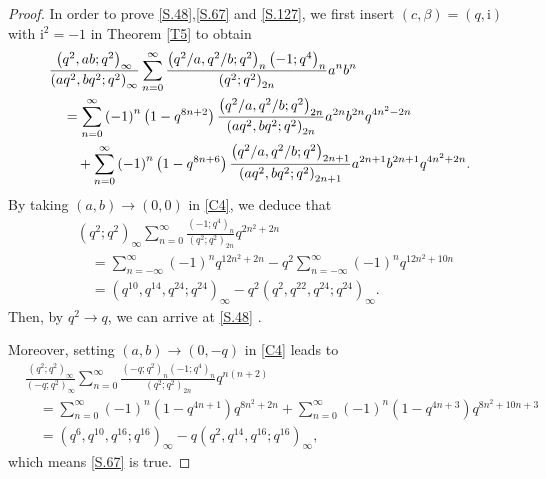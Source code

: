 \documentclass[reqno,12pt]{amsart}
\theoremstyle{remark}
\numberwithin{equation}{section}
\begin{document}
\begin{proof}
In order to prove \eqref{S.48},\eqref{S.67} and \eqref{S.127}, we first
insert $\left(c,\beta\right)=\left(q,\mathrm{i}\right)$ with $\mathrm{i}^2=-1$ in Theorem \ref{T5} to obtain
\begin{align}
&\frac{\left(q^2,ab;q^2\right)_{\infty}}{\left(aq^2,bq^2;q^2\right)_{\infty}}
\sum_{n=0}^{\infty}
\frac{\left(q^2/a,q^2/b;q^2\right)_n\left(-1;q^4\right)_n}{\left(q^2;q^2\right)_{2n}}a^nb^n\notag\\
&\quad=
\sum_{n=0}^{\infty}\left(-1\right)^n\left(1-q^{8n+2}\right)\frac{\left(q^2/a,q^2/b;q^2\right)_{2n}}
{\left(aq^2,bq^2;q^2\right)_{2n}}a^{2n}b^{2n}q^{4n^2-2n}\notag\\
&\qquad+
\sum_{n=0}^{\infty}\left(-1\right)^n\left(1-q^{8n+6}\right)\frac{\left(q^2/a,q^2/b;q^2\right)_{2n+1}}
{\left(aq^2,bq^2;q^2\right)_{2n+1}}a^{2n+1}b^{2n+1}q^{4n^2+2n}.\label{C4}
\end{align}
By taking $\left(a,b\right)\to\left(0,0\right)$  in \eqref{C4}, we deduce that
\begin{align*}
&\left(q^2;q^2\right)_{\infty}\sum_{n=0}^{\infty}
\frac{\left(-1;q^4\right)_n}{\left(q^2;q^2\right)_{2n}}q^{2n^2+2n}\\
&\quad=\sum_{n=-\infty}^{\infty}\left(-1\right)^nq^{12n^2+2n}
-q^2\sum_{n=-\infty}^{\infty}\left(-1\right)^nq^{12n^2+10n}\\
&\quad=\left(q^{10},q^{14},q^{24};q^{24}\right)_{\infty}
-q^2\left(q^{2},q^{22},q^{24};q^{24}\right)_{\infty}.
\end{align*}
Then, by $q^2\to q$, we can arrive at \eqref{S.48} .

Moreover, setting $\left(a,b\right)\to\left(0,-q\right)$ in \eqref{C4} leads to
\begin{align}
&\frac{\left(q^2;q^2\right)_{\infty}}{\left(-q;q^2\right)_{\infty}}
\sum_{n=0}^{\infty}\frac{\left(-q;q^2\right)_{n}
\left(-1;q^4\right)_{n}}
{\left(q^2;q^2\right)_{2n}}q^{n\left(n+2\right)}\nonumber\\
&\quad=\sum_{n=0}^{\infty}\left(-1\right)^n\left(1-q^{4n+1}\right)
q^{8n^2+2n}+\sum_{n=0}^{\infty}\left(-1\right)^n
\left(1-q^{4n+3}\right)q^{8n^2+10n+3}\nonumber\\
&\quad=\left(q^6,q^{10},q^{16};q^{16}\right)_{\infty}
-q\left(q^2,q^{14},q^{16};q^{16}\right)_{\infty},\nonumber
\end{align}
which means  \eqref{S.67} is true.


\end{proof}
\end{document}
